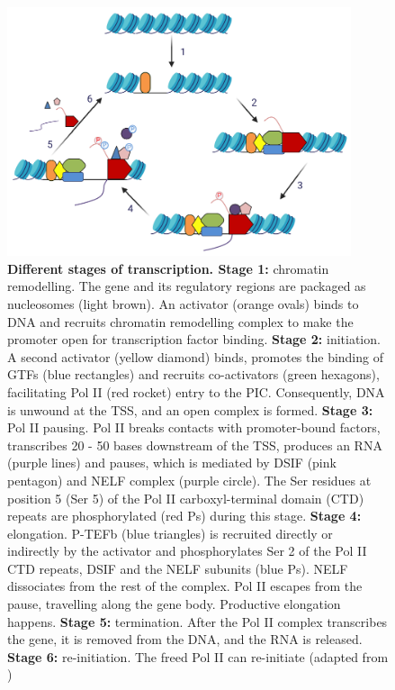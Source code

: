 \begin{figure}[!ht]
    \centering
    \includegraphics[width=0.9\textwidth]{chapter1/figures/fig2.pdf}
    \caption[Different stages of transcription]{\textbf{Different stages of transcription. Stage 1:} chromatin remodelling. The gene and its regulatory regions are packaged as nucleosomes (light brown). An activator (orange ovals) binds to DNA and recruits chromatin remodelling complex to make the promoter open for transcription factor binding. \textbf{Stage 2:} initiation. A second activator (yellow diamond) binds, promotes the binding of GTFs (blue rectangles) and recruits co-activators (green hexagons), facilitating Pol II (red rocket) entry to the PIC. Consequently, DNA is unwound at the TSS, and an open complex is formed. \textbf{Stage 3:} Pol II pausing. Pol II breaks contacts with promoter-bound factors, transcribes 20 - 50 bases downstream of the TSS, produces an RNA (purple lines) and pauses, which is mediated by DSIF (pink pentagon) and NELF complex (purple circle). The Ser residues at position 5 (Ser 5) of the Pol II carboxyl-terminal domain (CTD) repeats are phosphorylated (red Ps) during this stage. \textbf{Stage 4:} elongation. P-TEFb (blue triangles) is recruited directly or indirectly by the activator and phosphorylates Ser 2 of the Pol II CTD repeats, DSIF and the NELF subunits (blue Ps). NELF dissociates from the rest of the complex. Pol II escapes from the pause, travelling along the gene body. Productive elongation happens. \textbf{Stage 5:} termination. After the Pol II complex transcribes the gene, it is removed from the DNA, and the RNA is released. \textbf{Stage 6:} re-initiation. The freed Pol II can re-initiate (adapted from \cite{fuda2009defining})}
    \label{fig:fig2}
\end{figure}


